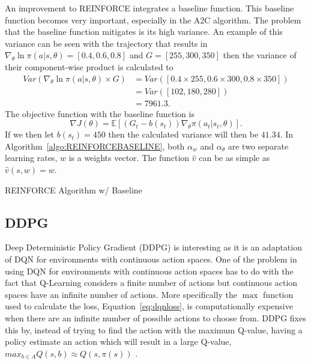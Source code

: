 An improvement to REINFORCE integrates a baseline function. This baseline function becomes very important, especially in the A2C algorithm. The problem that the baseline function mitigates is its high variance. An example of this variance can be seen with the trajectory that results in $\nabla_\theta \ln \pi(a|s, \theta)=[0.4, 0.6, 0.8]$ and $G=[255, 300, 350]$ then the variance of their component-wise product is calculated to 
\begin{align*}
	Var(\nabla_\theta \ln \pi(a|s, \theta)\times G)&=Var([0.4\times 255, 0.6\times 300, 0.8\times 350])\\
	&=Var([102, 180, 280])\\
	&=7961.3.
\end{align*} The objective function with the baseline function is $$\nabla J(\theta)=\mathbb{E}[(G_t-b(s_t))\nabla_\theta \pi (a_t|s_t, \theta)].$$ If we then let $b(s_t)=450$ then the calculated variance will then be $41.34$. In Algorithm~\ref{algo:REINFORCEBASELINE}, both $\alpha_w$ and $\alpha_\theta$ are two separate learning rates, $w$ is a weights vector. The function $\hat{v}$ can be as simple as $\hat{v}(s, w)=w$.

\begin{algorithm}\label{algo:REINFORCEBASELINE}
	\SetAlgoLined
	\DontPrintSemicolon
	
	\caption{REINFORCE Algorithm w/ Baseline}
\end{algorithm}

\subsection{DDPG}

Deep Deterministic Policy Gradient (DDPG) is interesting as it is an adaptation of DQN for environments with continuous action spaces. One of the problem in using DQN for environments with continuous action spaces has to do with the fact that Q-Learning considers a finite number of actions but continuous action spaces have an infinite number of actions. More specifically the $\max$ function used to calculate the loss, Equation~\ref{eq:dqnloss}, is computationally expensive when there are an infinite number of possible actions to choose from. DDPG fixes this by, instead of trying to find the action with the maximum Q-value, having a policy estimate an action which will result in a large Q-value, $max_{b\in A} Q(s,b)\approx Q(s, \pi(s))$ \cite{lillicrap_hunt_pritzel_heess_erez_tassa_silver_wierstra_2015}.

